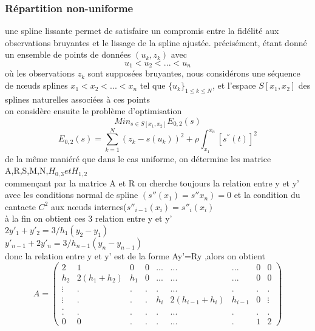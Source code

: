 \documentclass[a4paper,12pt]{article} %
\begin{document}
			\subsubsection{Répartition non-uniforme}
			    une spline lissante permet de satisfaire un compromis entre la fidélité aux observations bruyantes et le lissage de la spline ajustée. précisément, étant donné un ensemble de points de données $(u_k,z_k)$ avec $$u_{1}<u_{2}< ... <u_{n}$$
                où les observations $z_k$ sont supposées bruyantes, nous considérons une séquence de nœuds splines $x_{1}< x_{2}<... < x_{n}$
                tel que $\{{u_k}\}_{1 \leq k \leq N}$, et l'espace $S[x_1,x_2]$ des splines naturelles associées à ces points \\
                on considère ensuite le problème d'optimisation $$Min_{s \in S[x_1,x_2]}E_{0,2}(s)$$
                $$E_{0,2}(s)=\sum_{k=1}^{N}(z_k-s(u_k))^2+\rho\int_{x_1}^{x_n}[s^{''}(t)]^2$$
                de la même maniéré que dans le cas uniforme, on détermine les matrice A,R,S,M,N,$H_{0,3} et H_{1,2}$\\
                commençant par la matrice A et R on cherche toujours la relation entre y et y' avec les conditions normal de  spline 
                $(s''(x_1)=s''x_n)=0$ et la condition du cantacte $C^2$ aux nœuds internes($s''_{i-1}(x_i)=s''_i(x_i)$\\
                à la fin on obtient ces 3 relation entre y et y'\\
                $2y'_1+y'_2=3/h_1(y_2-y_1)$\\
                $y'_{n-1}+2y'_n=3/h_{n-1}(y_n-y_{n-1})$\\
                donc la relation entre y et y' est de la forme Ay'=Ry ,alors on obtient \\
                $$A=\begin{pmatrix} 2&1&0&0&...&...&...&0&0 \\ h_2&2(h_1+h_2)&h_1&0&...&...&...&0&0 \\ \vdots&.&.&.&.&...&.&.&.\\ \vdots&.&.&.&h_i&2(h_{i-1}+h_i)&h_{i-1}&0&\vdots \\. \\.&.&.&.&.&...&.&.&. \\ 0&0&.&.&.&...&.&1&2 \end{pmatrix}$$\\
                
\end{document}
